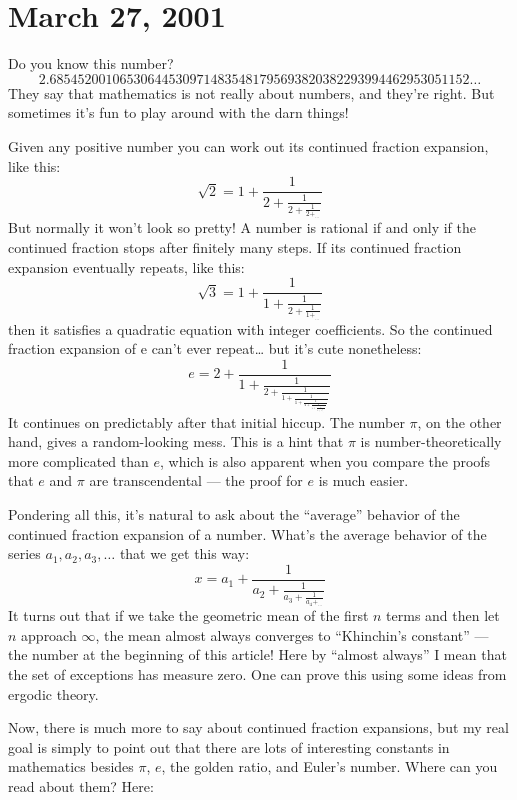 \documentclass{article}
\def\tightlist{}
\renewcommand{\texttt}[1]{%
  \begingroup
  \ttfamily
  \begingroup\lccode`~=`/\lowercase{\endgroup\def~}{/\discretionary{}{}{}}%
  \begingroup\lccode`~=`[\lowercase{\endgroup\def~}{[\discretionary{}{}{}}%
  \begingroup\lccode`~=`.\lowercase{\endgroup\def~}{.\discretionary{}{}{}}%
  \catcode`/=\active\catcode`[=\active\catcode`.=\active
  \scantokens{#1\noexpand}%
  \endgroup
}
\begin{document}
\hypertarget{week166}{%
\section{March 27, 2001}\label{week166}}

Do you know this number?
\[2.685452001065306445309714835481795693820382293994462953051152\ldots\]
They say that mathematics is not really about numbers, and they're
right. But sometimes it's fun to play around with the darn things!

Given any positive number you can work out its continued fraction
expansion, like this:
\[\sqrt{2} = 1+\frac{1}{2+\frac{1}{2+\frac{1}{2+_{\ldots}}}}\] But
normally it won't look so pretty! A number is rational if and only if
the continued fraction stops after finitely many steps. If its continued
fraction expansion eventually repeats, like this:
\[\sqrt{3} = 1+\frac{1}{1+\frac{1}{2+\frac{1}{1+_{\ldots}}}}\] then it
satisfies a quadratic equation with integer coefficients. So the
continued fraction expansion of e can't ever repeat\ldots{} but it's
cute nonetheless:
\[e = 2+\frac{1}{1+\frac{1}{2+\frac{1}{1+\frac{1}{1+\frac{1}{4+\frac{1}{1+\frac{1}{1+\frac{1}{6+_{\ldots}}}}}}}}}\]
It continues on predictably after that initial hiccup. The number
\(\pi\), on the other hand, gives a random-looking mess. This is a hint
that \(\pi\) is number-theoretically more complicated than \(e\), which
is also apparent when you compare the proofs that \(e\) and \(\pi\) are
transcendental --- the proof for \(e\) is much easier.

Pondering all this, it's natural to ask about the ``average'' behavior
of the continued fraction expansion of a number. What's the average
behavior of the series \(a_1, a_2, a_3, \ldots\) that we get this way:
\[x=a_1+\frac{1}{a_2+\frac{1}{a_3+\frac{1}{a_4+_{\ldots}}}}\] It turns
out that if we take the geometric mean of the first \(n\) terms and then
let \(n\) approach \(\infty\), the mean almost always converges to
``Khinchin's constant'' --- the number at the beginning of this article!
Here by ``almost always'' I mean that the set of exceptions has measure
zero. One can prove this using some ideas from ergodic theory.

Now, there is much more to say about continued fraction expansions, but
my real goal is simply to point out that there are lots of interesting
constants in mathematics besides \(\pi\), \(e\), the golden ratio, and
Euler's number. Where can you read about them? Here:

\end{document}
